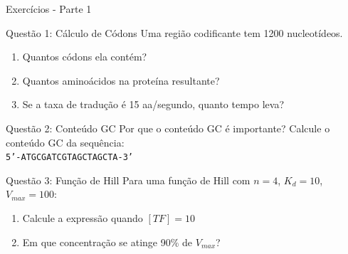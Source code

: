 \begin{frame}[allowframebreaks]{Exercícios - Parte 1}
\begin{block}{Questão 1: Cálculo de Códons}
Uma região codificante tem 1200 nucleotídeos.
\begin{enumerate}
    \item Quantos códons ela contém?
    \item Quantos aminoácidos na proteína resultante?
    \item Se a taxa de tradução é 15 aa/segundo, quanto tempo leva?
\end{enumerate}
\end{block}

\vspace{0.3cm}

\begin{block}{Questão 2: Conteúdo GC}
Por que o conteúdo GC é importante? Calcule o conteúdo GC da sequência:\\
\texttt{5'-ATGCGATCGTAGCTAGCTA-3'}
\end{block}

\vspace{0.3cm}

\begin{block}{Questão 3: Função de Hill}
Para uma função de Hill com $n=4$, $K_d=10$, $V_{max}=100$:
\begin{enumerate}
    \item Calcule a expressão quando $[TF]=10$
    \item Em que concentração se atinge 90\% de $V_{max}$?
\end{enumerate}
\end{block}
\end{frame}

